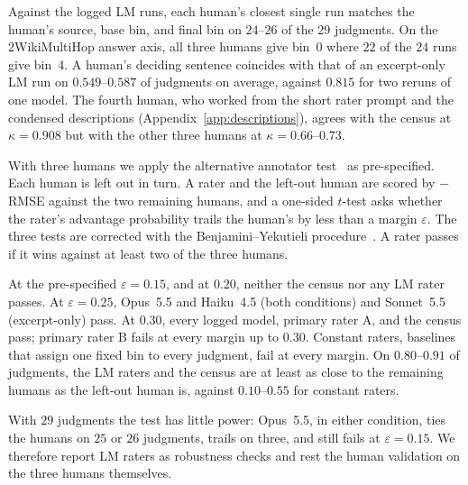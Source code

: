 \documentclass[11pt]{article}
\begin{document}
Against the logged LM runs, each human's closest single run matches the human's source, base bin, and final bin on $24$--$26$ of the $29$ judgments. On the 2WikiMultiHop answer axis, all three humans give bin~0 where $22$ of the $24$ runs give bin~4. A human's deciding sentence coincides with that of an excerpt-only LM run on $0.549$--$0.587$ of judgments on average, against $0.815$ for two reruns of one model. The fourth human, who worked from the short rater prompt and the condensed descriptions (Appendix~\ref{app:descriptions}), agrees with the census at $\kappa=0.908$ but with the other three humans at $\kappa=0.66$--$0.73$.

With three humans we apply the alternative annotator test~\citep{calderon2025alttest} as pre-specified. Each human is left out in turn. A rater and the left-out human are scored by $-$RMSE against the two remaining humans, and a one-sided $t$-test asks whether the rater's advantage probability trails the human's by less than a margin $\varepsilon$. The three tests are corrected with the Benjamini--Yekutieli procedure~\citep[$q=0.05$]{benjamini2001by}. A rater passes if it wins against at least two of the three humans.

At the pre-specified $\varepsilon=0.15$, and at $0.20$, neither the census nor any LM rater passes. At $\varepsilon=0.25$, Opus~5.5 and Haiku~4.5 (both conditions) and Sonnet~5.5 (excerpt-only) pass. At $0.30$, every logged model, primary rater A, and the census pass; primary rater B fails at every margin up to $0.30$. Constant raters, baselines that assign one fixed bin to every judgment, fail at every margin. On $0.80$--$0.91$ of judgments, the LM raters and the census are at least as close to the remaining humans as the left-out human is, against $0.10$--$0.55$ for constant raters.

With $29$ judgments the test has little power: Opus~5.5, in either condition, ties the humans on $25$ or $26$ judgments, trails on three, and still fails at $\varepsilon=0.15$. We therefore report LM raters as robustness checks and rest the human validation on the three humans themselves.
\end{document}
